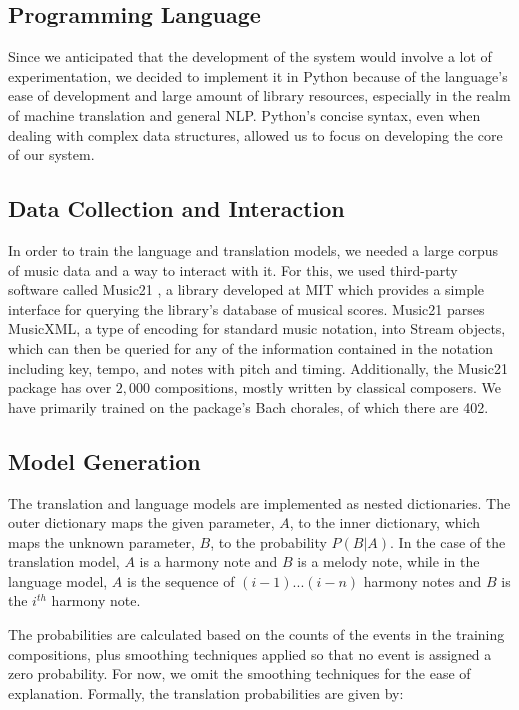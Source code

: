 \documentclass{sig-alternate}
\begin{document}
\subsection{Programming Language}
Since we anticipated that the development of the system would involve a lot of experimentation, we decided to implement it in Python because of the language's ease of development and large amount of library resources, especially in the realm of machine translation and general NLP. Python's concise syntax, even when dealing with complex data structures, allowed us to focus on developing the core of our system.

\subsection{Data Collection and Interaction}
In order to train the language and translation models, we needed a large corpus of music data and a way to interact with it. For this,
we used third-party software called Music21 \cite{Cuthbert_music21:a}, a library developed at MIT which provides a simple interface for querying the library's database of musical scores. Music21 parses MusicXML, a type of encoding for standard music notation, into Stream objects, which can then be queried for any of the information contained in the notation including key, tempo, and notes with pitch and timing. Additionally, the Music21 package has over $2,000$ compositions, mostly written by classical composers. We have primarily trained on the package's Bach chorales, of which there are 402.

\subsection{Model Generation}
The translation and language models are implemented as nested dictionaries. The outer dictionary maps the given parameter, $A$, to the inner dictionary, which maps the unknown parameter, $B$, to the probability $P(B | A)$. In the case of the translation model, $A$ is a harmony note and $B$ is a melody note, while in the language model, $A$ is the sequence of $(i - 1) ... (i - n)$ harmony notes and $B$ is the $i^{th}$ harmony note.

The probabilities are calculated based on the counts of the events in the training compositions, plus smoothing techniques applied so that no event is assigned a zero probability. For now, we omit the smoothing techniques for the ease of explanation. Formally, the translation probabilities are given by:\\
\end{document}
